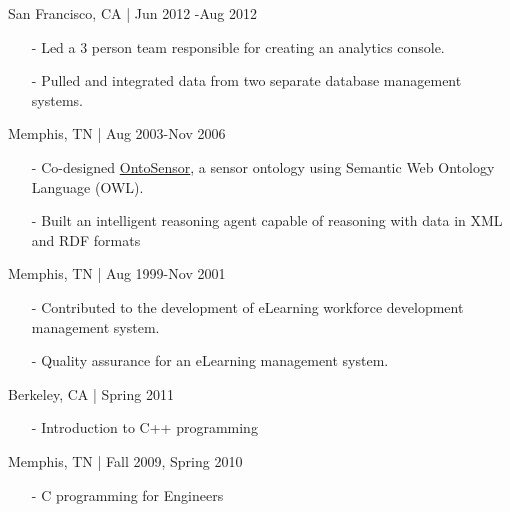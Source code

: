 \documentclass[11pt,article,oneside]{memoir}
\begin{document}
 \hfill San Francisco, CA | Jun 2012 -Aug 2012
\begin{itemize}[nolistsep]
\item[-]Led a 3 person team responsible for creating an analytics console.
\item[-]Pulled and integrated data from two separate database management systems.
\end{itemize} 

 \hfill Memphis, TN | Aug 2003-Nov 2006
\begin{itemize}[nolistsep]
\item[-]Co-designed \href{https://scholar.google.com/scholar?hl=en&q=Building+a+Sensor+Ontology\%3A+A+Practical+Approach+Leveraging+ISO+and+OGC+Models.&btnG=&as_sdt=1\%2C43&as_sdtp=}{OntoSensor}, a sensor ontology using Semantic Web Ontology Language (OWL).
\item[-]Built an intelligent reasoning agent capable of reasoning with data in XML and RDF formats
\end{itemize}

 \hfill Memphis, TN | Aug 1999-Nov 2001
\begin{itemize}[nolistsep]
\item[-]Contributed to the development of eLearning workforce development management system.
\item[-]Quality assurance for an eLearning management system.
\end{itemize} 

\bigskip 

\medskip

 \hfill Berkeley, CA | Spring 2011
\begin{itemize}[noitemsep,nolistsep] 
\item[-] Introduction to C++ programming
\end{itemize} 

 \hfill Memphis, TN | Fall 2009, Spring 2010
\begin{itemize}[noitemsep,nolistsep]
\item[-] C programming for Engineers
\end{itemize}
\end{document}

